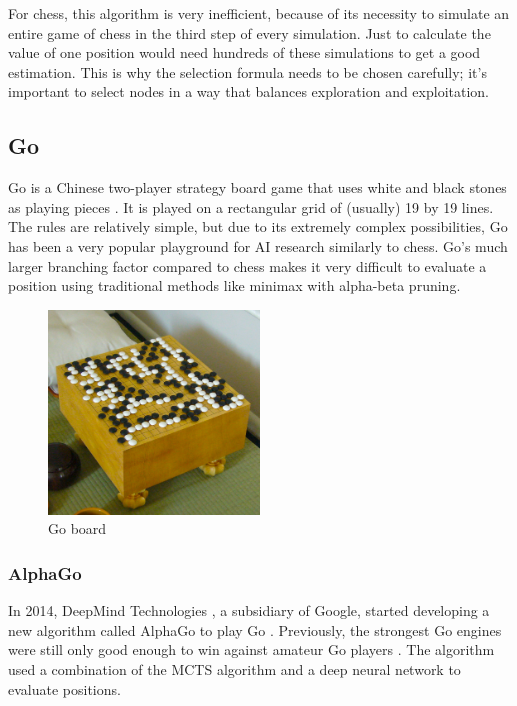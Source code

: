 \documentclass{article}
\begin{document}
For chess, this algorithm is very inefficient, because of its necessity to simulate 
an entire game of chess in the third step of every simulation. 
Just to calculate the value of one position would need hundreds of these simulations to get a good estimation.
This is why the selection formula needs to be chosen carefully; it's important to select nodes in a way that
balances exploration and exploitation.

\subsection{Go}

Go is a Chinese two-player strategy board game that uses white and black stones as playing pieces \cite{GoGame2022}.
It is played on a rectangular grid of (usually) 19 by 19 lines. The rules are relatively simple, but due to 
its extremely complex possibilities, Go has been a very popular playground for AI research similarly to chess.
Go's much larger branching factor compared to chess makes it very difficult to evaluate a position using 
traditional methods like minimax with alpha-beta pruning.

\begin{figure}[H]
    \centering
    \includegraphics[width=0.5\textwidth]{img/go.jpg}
    \caption{Go board \cite{GoGame2022}}
\end{figure}

\subsubsection{AlphaGo}

In 2014, DeepMind Technologies \cite{DeepMind2022}, a subsidiary of Google, 
started developing a new algorithm called AlphaGo to play Go \cite{AlphaGo2022a}. 
Previously, the strongest Go engines were still only good enough to win against amateur Go players \cite{AlphaGo}.
The algorithm used a combination of the MCTS algorithm and a deep neural network to evaluate positions. 
\end{document}

